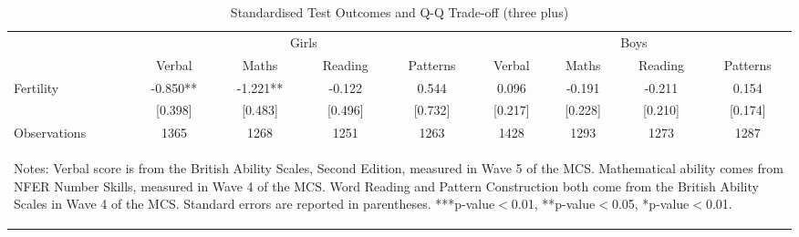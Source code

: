 \begin{table}[htbp]\centering
\def\sym#1{\ifmmode^{#1}\else\(^{#1}\)\fi}
\caption{Standardised Test Outcomes and Q-Q Trade-off (three plus)}
\begin{tabular}{l*{8}{c}}
\toprule
                    &\multicolumn{4}{c}{Girls}                                      &\multicolumn{4}{c}{Boys}                                       \\\cmidrule(lr){2-5}\cmidrule(lr){6-9}
                    &      Verbal   &       Maths   &     Reading   &    Patterns   &      Verbal   &       Maths   &     Reading   &    Patterns   \\
\midrule
Fertility           &      -0.850** &      -1.221** &      -0.122   &       0.544   &       0.096   &      -0.191   &      -0.211   &       0.154   \\
                    &     [0.398]   &     [0.483]   &     [0.496]   &     [0.732]   &     [0.217]   &     [0.228]   &     [0.210]   &     [0.174]   \\
\midrule
Observations        &        1365   &        1268   &        1251   &        1263   &        1428   &        1293   &        1273   &        1287   \\
\bottomrule\multicolumn{9}{p{15.8cm}}{\begin{footnotesize}
Notes: Verbal score is from the British Ability Scales,   
Second Edition, measured in Wave 5 of the MCS.            
Mathematical ability comes from NFER Number Skills,       
measured in Wave 4 of the MCS. Word Reading and Pattern   
Construction both come from the British Ability Scales in 
Wave 4 of the MCS. Standard errors are reported in parentheses. ***p-value$<$0.01, **p-value$<$0.05, *p-value$<$0.01.                                
\end{footnotesize}}\end{tabular}\end{table}
